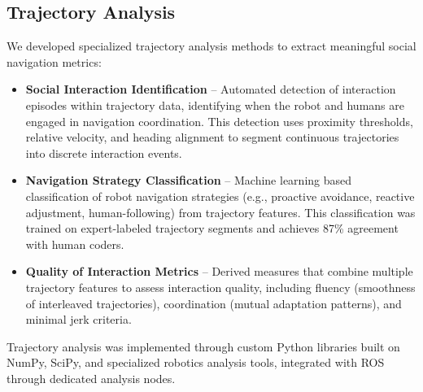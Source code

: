 
\subsection{Trajectory Analysis}
\label{subsec:trajectory_analysis}
We developed specialized trajectory analysis methods to extract meaningful social navigation 
metrics:
\begin{itemize}
    \item \textbf{Social Interaction Identification} -- Automated detection of interaction 
    episodes within trajectory data, identifying when the robot and humans are engaged in 
    navigation coordination. This detection uses proximity thresholds, relative velocity, 
    and heading alignment to segment continuous trajectories into discrete interaction events.
    \item \textbf{Navigation Strategy Classification} -- Machine learning based classification 
    of robot navigation strategies (e.g., proactive avoidance, reactive adjustment, human-following) 
    from trajectory features. This classification was trained on expert-labeled trajectory segments 
    and achieves 87\% agreement with human coders.
    \item \textbf{Quality of Interaction Metrics} -- Derived measures that combine multiple trajectory 
    features to assess interaction quality, including fluency (smoothness of interleaved trajectories), 
    coordination (mutual adaptation patterns), and minimal jerk criteria.
\end{itemize}
Trajectory analysis was implemented through custom Python libraries built on NumPy, SciPy, and 
specialized robotics analysis tools, integrated with ROS through dedicated analysis nodes.


